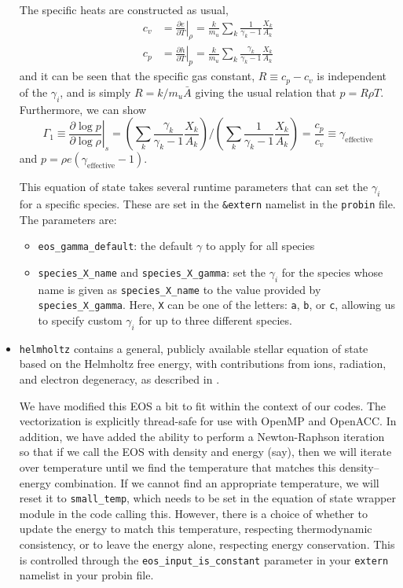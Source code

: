 \documentclass[11pt]{book}
\begin{document}
\begin{itemize}
The specific heats are constructed as usual, 
\begin{align}
c_v &= \left . \frac{\partial e}{\partial T} \right |_\rho = 
    \frac{k}{m_u} \sum_k \frac{1}{\gamma_k - 1} \frac{X_k}{A_k} \\
c_p &= \left . \frac{\partial h}{\partial T} \right |_p = 
    \frac{k}{m_u} \sum_k \frac{\gamma_k}{\gamma_k - 1} \frac{X_k}{A_k} 
\end{align}
and it can be seen that the specific gas constant, $R \equiv c_p - c_v$ is
independent of the $\gamma_i$, and is simply $R = k/m_u\bar{A}$ giving the
usual relation that $p = R\rho T$.  Furthermore, we can show
\begin{equation}
\Gamma_1 \equiv \left . \frac{\partial \log p}{\partial \log \rho} \right |_s =  
   \left ( \sum_k \frac{\gamma_k}{\gamma_k - 1} \frac{X_k}{A_k} \right ) \bigg /
   \left ( \sum_k \frac{1}{\gamma_k - 1} \frac{X_k}{A_k} \right ) =
\frac{c_p}{c_v} \equiv \gamma_\mathrm{effective} 
\end{equation}
and $p = \rho e (\gamma_\mathrm{effective} - 1)$.

This equation of state takes several runtime parameters that can set the
$\gamma_i$ for a specific species.  These are set in the {\tt \&extern}
namelist in the {\tt probin} file.  The parameters are:
\begin{itemize}
\item {\tt eos\_gamma\_default}: the default $\gamma$ to apply for
  all species
\item {\tt species\_X\_name} and {\tt species\_X\_gamma}: set the $\gamma_i$
  for the species whose name is given as {\tt species\_X\_name} to the
  value provided by {\tt species\_X\_gamma}.  Here, {\tt X} can be one
  of the letters: {\tt a}, {\tt b}, or {\tt c}, allowing us to specify
  custom $\gamma_i$ for up to three different species.
\end{itemize}

\item {\tt helmholtz} contains a general, publicly available
stellar equation of state based on the Helmholtz free energy,
with contributions from ions, radiation, and electron degeneracy, as
described in \cite{timmes:1999,timmes:2000,flash}.

We have modified this EOS a bit to fit within the context of our codes. The 
vectorization is explicitly thread-safe for use with OpenMP and OpenACC.
In addition, we have added the ability to perform a Newton-Raphson iteration 
so that if we call the EOS with density and energy (say), then we will 
iterate over temperature until we find the temperature that matches 
this density--energy combination. If we cannot find an appropriate temperature,
we will reset it to {\tt small\_temp}, which needs to be set in the 
equation of state wrapper module in the code calling this. However, 
there is a choice of whether to update the energy to match this 
temperature, respecting thermodynamic consistency, or to leave 
the energy alone, respecting energy conservation. This is controlled through the 
\texttt{eos\_input\_is\_constant} parameter in your \texttt{extern}
namelist in your probin file.


\end{itemize}
\end{document}
